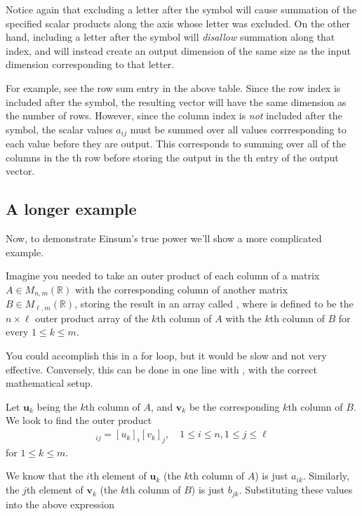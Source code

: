 \begin{info}
Notice again that excluding a letter after the \li{->} symbol will cause summation of the specified scalar products along the axis whose letter was excluded.
On the other hand, including a letter after the \li{->} symbol will \emph{disallow} summation along that index, and will instead create an output dimension of the same size as the input dimension corresponding to that letter.

\noindent For example, see the row sum entry in the above table.
Since the row index  is included after the \li{->} symbol, the resulting vector will have the same dimension as the number of rows.
However, since the column index  is \emph{not} included after the \li{->} symbol, the scalar values $a_{ij}$ must be summed over all  values corrresponding to each  value before they are output. 
This corresponds to summing over all of the columns in the th row before storing the output in the th entry of the output vector.
\end{info}

\subsection*{A longer example}

Now, to demonstrate Einsum's true power we'll show a more complicated example. 

Imagine you needed to take an outer product of each column of a matrix $A \in M_{n,m}(\mathbb{R})$ with the corresponding column of another matrix $B \in M_{\ell,m}(\mathbb{R})$, storing the result in an array called , where  is defined to be the $n \times \ell$ outer product array of the $k$th column of $A$ with the $k$th column of $B$ for every $1 \leq k \leq m$.

You could accomplish this in a for loop, but it would be slow and not very effective. 
Conversely, this can be done in one line with , with the correct mathematical setup.

Let $\mathbf{u}_k$ being the $k$th column of $A$, and $ \mathbf{v}_k$ be the corresponding $k$th column of $B$. 
We look to find the outer product
\begin{align*}
	[\mathbf{u}_k \otimes \mathbf{v}_k]_{ij} = [u_{k}]_{i} [v_{k}]_{j}, \quad 1 \leq i \leq n, 1 \leq j \leq \ell
\end{align*}
for $1 \leq k \leq m$.

We know that the $i$th element of $\mathbf{u}_k$ (the $k$th column of $A$) is just $a_{ik}$. Similarly, the $j$th element of $\mathbf{v}_{k}$ (the $k$th column of $B$) is just $b_{jk}$. Substituting these values into the above expression

